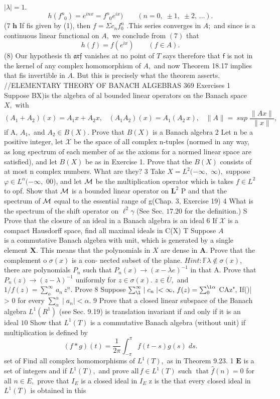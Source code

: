 $|\lambda|=1.$ $$ h(f_{\;\;0}^{n})=e^{i n x}=f_{\;\;0}^{n}e^{i x})\qquad(n=0,\;\pm1,\;\pm2,\,\ldots). $$ (7 ${\boldsymbol{h}}$ If fis given by (1), then $f=\Sigma c_{n}f_{0}^{n}$ .This series converges in $A{\mathrm{;}}$ and since is a continuous linear functional on $A,$ we conclude from $\left(7\right)$ that $$ h(f)=f(e^{i x})\qquad(f\in A). $$ (8) Our hypothesis th ${\mathfrak{a r f}}$ vanishes at no point of ${\mathbf{}}T$ says therefore that $\boldsymbol{\mathsf{f}}$ is not in the kernel of any complex homomorphism of $A,$ and now Theorem 18.17 implies that fis invertible in $A.$ But this is precisely what the theorem asserts. //ELEMENTARY THEORY OF BANACH ALGEBRAS 369 Exercises 1 Suppose BX)is the algebra of al bounded linear operators on the Banach space $X,$ with $$ (A_{1}+A_{2})(x)=A_{1}x+A_{2}x,\;\;\;(A_{1}A_{2})(x)=A_{1}(A_{2}\,x),\;\;\;\|A\|=\ s u p\;{\frac{\|A x\|}{\|x\|}}, $$ if A, $A_{1},$ and $A_{2}\in B(X).$ Prove that $B(X)$ is a Banach algebra 2 Let n be a positive integer, let $\scriptstyle{\mathcal{X}}$ be the space of all complex n-tuples (normed in any way, as long spectrum of each member of as the axioms for a normed linear space are satisfied), and let $B(X)$ be as in Exercise 1. Prove that the $B(X)$ consists of at most n complex numbers. What are they? 3 Take $X=L^{2}(-\infty,$ $\infty),$ suppose $\varphi\in L^{\alpha}(-\infty,$ 00), and let ${\cal{M}}$ be the multiplication operator which is takes $f\in L^{2}$ to opf. Show that ${\cal{M}}$ is a bounded linear operator on ${\boldsymbol{L}}^{2}$ P and that the spectrum of ${\cal{M}}$ equal to the essential range of g(Chap. 3, Exercise 19) 4 What is the spectrum of the shift operator on $\ell^{2}\gamma$ (See Sec. $17.20$ for the definition.) S Prove that the closure of an ideal in a Banach algebra is an ideal 6 If $\scriptstyle{\mathcal{X}}$ is a compact Hausdorff space, find all maximal ideals in C(X) T Suppose $\scriptstyle A\quad\quad\quad\quad$ is a commutative Banach algebra with unit, which is generated by a single element $\mathbf{X}.$ This means that the polynomials in $\textstyle X$ are dense in ${\boldsymbol{A}}.$ Prove that the complement o $\sigma(x)$ is a con- nected subset of the plane. $H i n t:\mathbb{F}\lambda\not\in\sigma(x),$ there are polynomials ${\mathbf{}}P_{n}$ such that $P_{n}(x)\to(x-\lambda e)^{-1}$ in that A. Prove that $P_{n}(z)\to(z-\lambda)^{-1}$ uniformly for $z\in\sigma(x).$ $z\in{\bar{U}},$ and $1/f(z)=\sum_{o}^{\infty}\,a_{n}\,z^{n}.$ Prove 8 Suppose $\textstyle\sum_{\l}^{\infty}\mid c_{n}\mid<\infty,\,f(z)=\sum_{0}^{\l\alpha}$ CAz", If()| > 0 for every $\textstyle\sum_{\alpha}^{\alpha}\mid a_{n}\mid<\alpha.$ 9 Prove that a closed linear subspace of the Banach algebra $L^{1}(R^{1})$ (see Sec. 9.19) is translation invariant if and only if it is an ideal $10$ Show that $L^{1}(T)$ is a commutative Banach algebra (without unit) if multiplication is defined by $$ (f*g)(t)={\frac{1}{2\pi}}\int_{-\pi}^{\pi}f(t-s)g(s)\;d s. $$ set of Find all complex homomorphisms of $L^{1}(T),$ as in Theorem 9.23. 1 $\boldsymbol{E}$ is a set of integers and if $L^{1}(T),$ and prove ${\mathrm{all}}\,f\in L^{1}(T)$ such $\operatorname{that}{\hat{f}}(n)=0$ for all $n\in E,$ prove that $I_{E}$ is a closed ideal in $I_{E}$ z is the that every closed ideal in $L^{1}(T)$ is obtained in this 